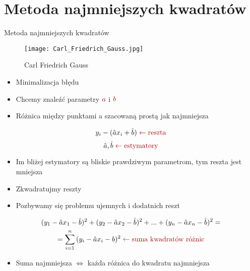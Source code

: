\documentclass[trans]{beamer}
\begin{document}
\section{Metoda najmniejszych kwadratów}

\begin{frame}{Metoda najmniejszych kwadratów}
	\centering
	\begin{figure}[!h]
		\texttt{[image: Carl\_Friedrich\_Gauss.jpg]}
		\caption{Carl Friedrich Gauss}
	\end{figure}
\end{frame}

\begin{frame}
	\begin{itemize}
		\item<1-> Minimalizacja błędu
		\item<2-> Chcemy znaleźć parametry $\color{accent} a$ i $\color{accent} b$
		\item<3-> Różnica między punktami a szacowaną prostą jak najmniejsza 
	\end{itemize}
	\[
		y_i - (\hat a x_i + \hat b) \color{accent} \leftarrow \text{reszta}
	\]
	\onslide<5->
	\[
		\hat a, \hat b \color{accent} \leftarrow \text{estymatory}
	\]
	\begin{itemize}
		\item<6-> Im bliżej estymatory są bliskie prawdziwym parametrom, tym reszta jest mniejsza
	\end{itemize}
\end{frame}

\begin{frame}
	\begin{itemize}
		\item<1-> Zkwadratujmy reszty
		\item<2-> Pozbywamy się problemu ujemnych i dodatnich reszt
	\end{itemize}
	\begin{gather*}
		(y_1 - \hat a x_1 - \hat b)^2 + (y_2 - \hat a x_2 - \hat b)^2 + ... + (y_n - \hat a x_n - \hat b)^2 = \\
		= \sum_{i=1}^n\,(y_i - \hat a x_i - b)^2 \color{accent} \leftarrow \text{suma kwadratów różnic}
	\end{gather*}
	\begin{itemize}
		\item<4-> Suma najmniejsza $\iff$ każda różnica do kwadratu najmniejsza 
	\end{itemize}
\end{frame}
\end{document}
